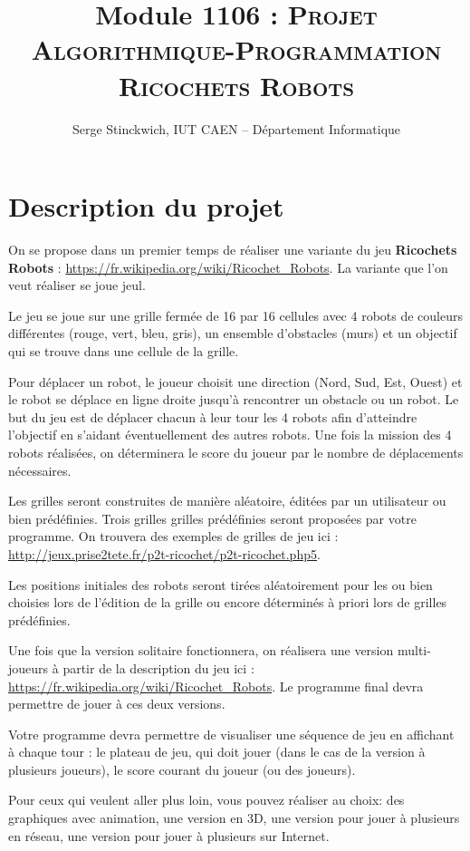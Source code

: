\documentclass[10pt]{article}
\title{Module 1106 : \textsc{Projet Algorithmique-Programmation \\ Ricochets Robots}}
\author{Serge Stinckwich, IUT CAEN -- Département Informatique}
\begin{document}
\maketitle

\pagestyle{empty}

\section{Description du projet}

On se propose dans un premier temps de réaliser une variante du jeu {\bf Ricochets Robots} : \url{https://fr.wikipedia.org/wiki/Ricochet_Robots}. La variante que l'on veut réaliser se joue jeul.

Le jeu se joue sur une grille fermée de 16 par 16 cellules avec 4 robots de couleurs différentes (rouge, vert,
bleu, gris), un ensemble d'obstacles (murs) et un objectif qui se trouve dans une cellule de la grille.

Pour déplacer un robot, le joueur choisit une direction (Nord, Sud, Est, Ouest) et le robot
se déplace en ligne droite jusqu'à rencontrer un obstacle ou un robot. Le but du jeu
est de déplacer chacun à leur tour les 4 robots afin d'atteindre l'objectif en s'aidant éventuellement des autres robots. Une fois la mission des 4 robots réalisées, on déterminera le score du joueur par le nombre de déplacements nécessaires.

Les grilles seront construites de manière aléatoire, éditées par un utilisateur ou bien prédéfinies. 
Trois grilles grilles prédéfinies seront proposées par votre programme. On trouvera des exemples de grilles de jeu ici :
\url{http://jeux.prise2tete.fr/p2t-ricochet/p2t-ricochet.php5}.

Les positions initiales des robots seront tirées aléatoirement pour les ou bien choisies lors de l'édition de la grille ou encore déterminés à priori lors de grilles prédéfinies.

 Une fois que la version solitaire fonctionnera, on réalisera une version multi-joueurs à partir de la description du jeu ici :
\url{https://fr.wikipedia.org/wiki/Ricochet_Robots}. Le programme final devra permettre de jouer à ces deux versions.

Votre programme devra permettre de visualiser une séquence de jeu en affichant à chaque tour : le plateau de jeu, qui doit jouer (dans le cas de la version à plusieurs joueurs), le score courant du joueur (ou des joueurs).

Pour ceux qui veulent aller plus loin, vous pouvez réaliser au choix: des graphiques avec animation, une version en 3D, une version pour jouer à plusieurs en réseau, une version pour jouer à plusieurs sur Internet.
\end{document}
